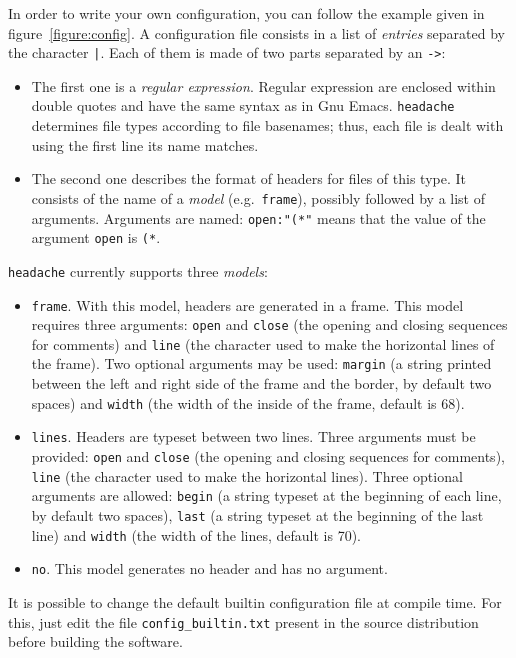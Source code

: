 \documentclass{article}
\newcommand{\mytt}[1]{\texttt{#1}}
\newcommand{\headache}{\mytt{headache}}
\begin{document}
In order to write your own configuration, you can follow the example
given in figure~\ref{figure:config}.  A configuration file consists in
a list of \emph{entries} separated by the character \mytt{|}.  Each
of them is made of two parts separated by an \mytt{->}:
\begin{itemize}
\item The first one is a \emph{regular expression}.  Regular
  expression are enclosed within double quotes and have the same
  syntax as in Gnu Emacs.  \headache{} determines file types according to
  file basenames; thus, each file is dealt with using the first line
  its name matches.
\item The second one describes the format of headers for files of this
  type.  It consists of the name of a \emph{model} (e.g.\ 
  \mytt{frame}), possibly followed by a list of arguments.  Arguments
  are named: \mytt{open:"(*"} means that the value of the argument
  \mytt{open} is \mytt{(*}.
\end{itemize}
\headache{} currently supports three \emph{models}:
\begin{itemize}
\item \mytt{frame}.  With this model, headers are generated in a
  frame.  This model requires three arguments: \mytt{open} and
  \mytt{close} (the opening and closing sequences for comments) and
  \mytt{line} (the character used to make the horizontal lines of the
  frame).  Two optional arguments may be used: \mytt{margin} (a string
  printed between the left and right side of the frame and the border,
  by default two spaces) and \mytt{width} (the width of the inside of
  the frame, default is 68).
\item \mytt{lines}.  Headers are typeset between two lines.  Three
  arguments must be provided: \mytt{open} and \mytt{close} (the
  opening and closing sequences for comments), \mytt{line} (the
  character used to make the horizontal lines).  Three optional
  arguments are allowed: \mytt{begin} (a string typeset at the
  beginning of each line, by default two spaces), \mytt{last} (a
  string typeset at the beginning of the last line) and \mytt{width}
  (the width of the lines, default is 70).
\item \mytt{no}.  This model generates no header and has no argument.
\end{itemize}


It is possible to change the default builtin configuration file at
compile time.  For this, just edit the file \mytt{config\_builtin.txt}
present in the source distribution before building the software.
\end{document}
